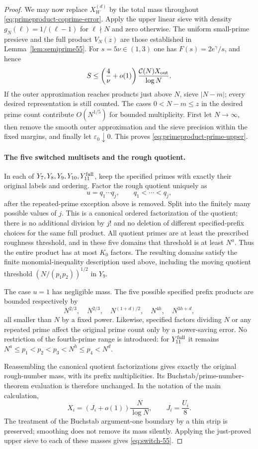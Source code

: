 \documentclass[11pt]{article}
\newcommand{\CN}{\mathcal C(N)}
\begin{document}
\begin{proof}
We may now replace $X_W^{(d)}$ by the total mass throughout
\eqref{eq:primeproduct-coprime-error}.
Apply the upper linear sieve with density
$g_N(\ell)=1/(\ell-1)$ for $\ell\nmid N$ and zero otherwise.
The uniform small-prime presieve and the full product $V_N(z)$
are those established in Lemma~\ref{lem:semiprime55}.
For $s=5\nu\in(1,3)$ one has $F(s)=2e^\gamma/s$, and hence
\[
 S\le\left(\frac4\nu+o(1)\right)
                    \frac{\CN X_{\rm out}}{\log N}.
\]
If the outer approximation reaches products just above $N$,
sieve $|N-m|$; every desired representation is still counted.
The cases $0<N-m\le z$ in the desired prime count contribute
$O(N^{1/5})$ for bounded
multiplicity. First let $N\to\infty$, then remove the smooth
outer approximation and the sieve precision within the fixed
margins, and finally let $\varepsilon_0\downarrow0$.
This proves \eqref{eq:primeproduct-prime-upper}.

\paragraph{The five switched multisets and the rough quotient.}
In each of $Y_7,Y_8,Y_9,Y_{10},Y_{11}^{\rm full}$, keep the
specified primes with exactly their original labels and ordering.
Factor the rough quotient uniquely as
\[
 u=q_1\cdots q_j,\qquad q_1<\cdots<q_j,
\]
after the repeated-prime exception above is removed.
Split into the finitely many possible values of $j$.
This is a canonical ordered factorization of the quotient;
there is no additional division by $j!$ and no deletion of
different specified-prefix choices for the same full product.
All quotient primes are at least the prescribed roughness
threshold, and in these five domains that threshold is at least
$N^a$. Thus the entire product has at most $K_0$ factors.
The resulting domains satisfy the finite monomial-inequality
description used above, including the moving quotient threshold
$(N/(p_1p_2))^{1/2}$ in $Y_9$.

The case $u=1$ has negligible mass. The five possible specified
prefix products are bounded respectively by
\[
 N^{2/3},\quad N^{2/3},\quad N^{(1+d)/2},
                  \quad N^{4h},\quad N^{3h+d},
\]
all smaller than $N$ by a fixed power.
Likewise, specified factors dividing $N$ or any repeated
prime affect the original prime count only by a power-saving
error. No restriction of the fourth-prime range is introduced:
for $Y_{11}^{\rm full}$ it remains
$N^a\le p_1<p_2<p_3<N^h\le p_4<N^d$.

Reassembling the canonical quotient factorizations gives exactly
the original rough-number mass, with its prefix multiplicities.
Its Buchstab/prime-number-theorem evaluation is therefore
unchanged. In the notation of the main calculation,
\[
 X_i=(J_i+o(1))\frac{N}{\log N},
 \qquad J_i=\frac{U_i}{8}.
\]
The treatment of the Buchstab argument-one boundary by a thin
strip is preserved; smoothing does not remove its mass silently.
Applying the just-proved upper sieve to each of these masses
gives \eqref{eq:switch-55}.
\end{proof}
\end{document}
